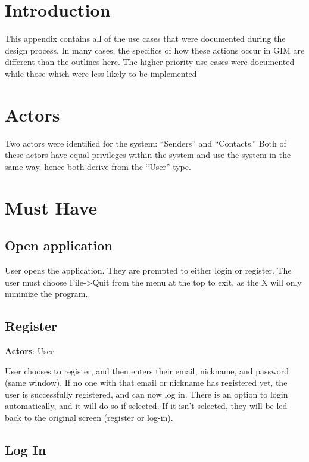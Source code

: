 \section{Introduction}

This appendix contains all of the use cases that were documented during the design process. In many cases, the specifics of how these actions occur in GIM are different than the outlines here. The higher priority use cases were documented while those which were less likely to be implemented

\section{Actors}

Two actors were identified for the system: ``Senders'' and ``Contacts.'' Both of these actors have equal privileges within the system and use the system in the same way, hence both derive from the ``User'' type.

\section{Must Have}

\subsection{Open application}

User opens the application. They are prompted to either login or register. The user must choose File->Quit from the menu at the top to exit, as the X will only minimize the program.

\subsection{Register}

{\bf Actors}: User

User chooses to register, and then enters their email, nickname, and password (same window). If no one with that email or nickname has registered yet, the user is successfully registered, and can now log in. There is an option to login automatically, and it will do so if selected. If it isn’t selected, they will be led back to the original screen (register or log-in).

\subsection{Log In}

